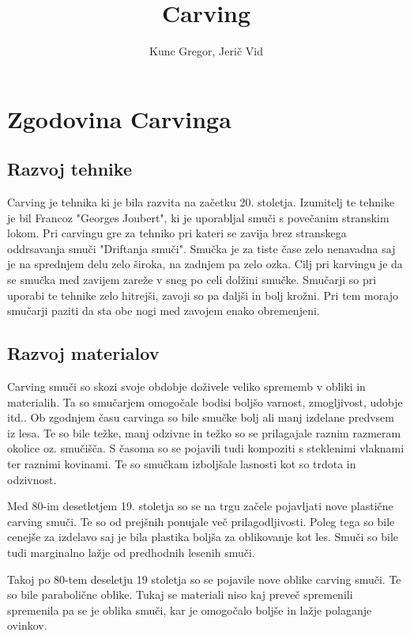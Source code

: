 \documentclass{article}
\title{Carving}
\author{Kunc Gregor, Jerič Vid}
\begin{document}
\maketitle

\section{Zgodovina Carvinga}

\subsection*{Razvoj tehnike}
Carving je tehnika ki je bila razvita na začetku 20. stoletja. Izumitelj te tehnike je bil Francoz "Georges Joubert", ki je uporabljal smuči s povečanim stranskim lokom.
Pri carvingu gre za tehniko pri kateri se zavija brez stranskega oddrsavanja smuči "Driftanja smuči".
Smučka je za tiste čase zelo nenavadna saj je na sprednjem delu zelo široka, na zadnjem pa zelo ozka.
Cilj pri karvingu je da se smučka med zavijem zareže v sneg po celi dolžini smučke. Smučarji so pri uporabi te tehnike zelo hitrejši, zavoji so pa daljši in bolj krožni. 
Pri tem morajo smučarji paziti da sta obe nogi med zavojem enako obremenjeni. 

\subsection*{Razvoj materialov}
Carving smuči so skozi svoje obdobje doživele veliko sprememb v obliki in materialih.
Ta so smučarjem omogočale bodisi boljšo varnost, zmogljivost, udobje itd..
Ob zgodnjem času carvinga so bile smučke bolj ali manj izdelane predvsem iz lesa.
Te so bile težke, manj odzivne in težko so se prilagajale raznim razmeram okolice oz. smučišča.
S časoma so se pojavili tudi kompoziti s steklenimi vlaknami ter raznimi kovinami.
Te so smučkam izboljšale lasnosti kot so trdota in odzivnost.


Med 80-im desetletjem 19. stoletja so se na trgu začele pojavljati nove plastične carving smuči.
Te so od prejšnih ponujale več prilagodljivosti. Poleg tega so bile cenejše za izdelavo saj je bila plastika boljša za oblikovanje kot les.
Smuči so bile tudi marginalno lažje od predhodnih lesenih smuči.


Takoj po 80-tem deseletju 19 stoletja so se pojavile nove oblike carving smuči. Te so bile parabolične oblike. Tukaj se materiali niso kaj preveč spremenili
spremenila pa se je oblika smuči, kar je omogočalo boljše in lažje polaganje ovinkov.
\end{document}
